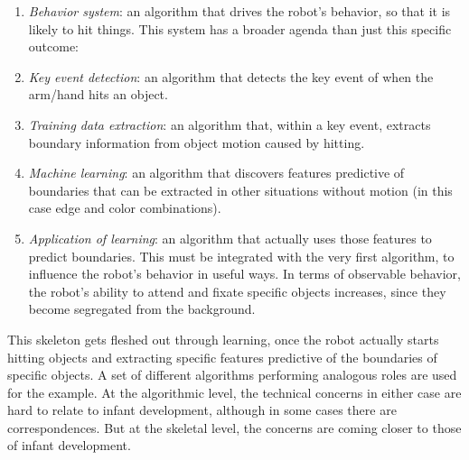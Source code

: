 \begin{enumerate} \pflist

\item {\em Behavior system}: an algorithm that drives the robot's
behavior, so that it is likely to hit things.  This system has a 
broader agenda than just this specific outcome:

\item {\em Key event detection}: an algorithm that detects the key event of
when the arm/hand hits an object.

\item {\em Training data extraction}: an algorithm that, within a key event,
extracts boundary information from object motion caused by hitting.

\item {\em Machine learning}: an algorithm that discovers features
predictive of boundaries that can be extracted in other situations
without motion (in this case edge and color combinations).

\item {\em Application of learning}: an algorithm that actually uses
those features to predict boundaries.  This must be integrated with
the very first algorithm, to influence the robot's behavior in useful
ways.  In terms of observable behavior, the robot's ability to attend
and fixate specific objects increases, since they become segregated from
the background.

\end{enumerate}

\noindent
This skeleton gets fleshed out through learning, once the
robot actually starts hitting objects and extracting specific features
predictive of the boundaries of specific objects.  
%
A set of different algorithms performing analogous roles are used
for the  example.
%
%
At the algorithmic level, the technical concerns 
in either
case are hard to relate to
infant development, although in some cases there are correspondences.
%
But at the skeletal level, the concerns are coming closer to those of
infant development.

%


